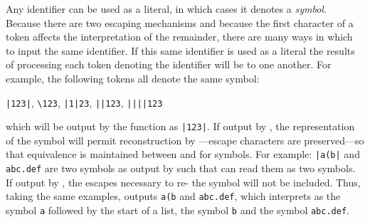 \begin{optDefinition}
Any identifier can be used as a literal, in which cases it denotes a
{\em symbol}.  Because there are two escaping mechanisms and because
the first character of a token affects the interpretation of the
remainder, there are many ways in which to input the same identifier.
If this same identifier is used as a literal the results of processing
each token denoting the identifier will be  to one another.
For example, the following tokens all denote the same symbol:
%
\begin{center}
\verb+|123|+, \verb+\123+, \verb+|1|23+, \verb+||123+, \verb+||||123+
\end{center}
%
which will be output by the function  as \verb+|123|+.  If
output by , the representation of the symbol will permit
reconstruction by ---escape characters are preserved---so that
equivalence is maintained between  and  for
symbols.  For example: \verb+|a(b|+ and \verb+abc.def+ are two symbols as output
by  such that  can read them as two
symbols.  If output by , the escapes necessary to
re- the symbol will not be included.  Thus, taking the same
examples,  outputs \verb+a(b+ and \verb+abc.def+, which
 interprets as the symbol \verb+a+ followed by the start of a
list, the symbol \verb+b+ and the symbol \verb+abc.def+.
%
\Syntax
\label{symbol-syntax}
%
%


\end{optDefinition}
